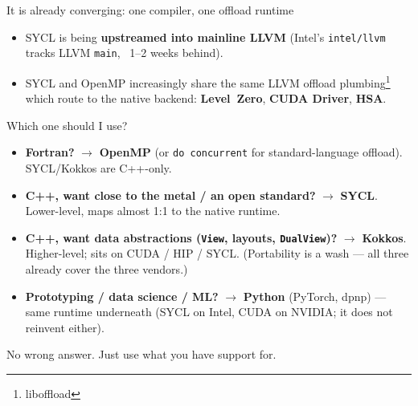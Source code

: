 \begin{frame}{It is already converging: one compiler, one offload runtime}
\begin{center}
\end{center}
\begin{itemize}
    \item SYCL is being \textbf{upstreamed into mainline LLVM} (Intel's \texttt{intel/llvm}
          tracks LLVM \texttt{main}, ~1--2 weeks behind).
    \item SYCL and OpenMP increasingly share the same LLVM offload plumbing\footnote{liboffload}  which route to the native backend: \textbf{Level~Zero}, \textbf{CUDA Driver}, \textbf{HSA}.
\end{itemize}

\end{frame}


\begin{frame}{Which one should I use?}
\begin{itemize}
    \item \textbf{Fortran?} $\rightarrow$ \textbf{OpenMP} (or \texttt{do concurrent}
          for standard-language offload). SYCL/Kokkos are C++-only.
    \item \textbf{C++, want close to the metal / an open standard?} $\rightarrow$
          \textbf{SYCL}. Lower-level, maps almost 1:1 to the native runtime.
    \item \textbf{C++, want data abstractions (\texttt{View}, layouts, \texttt{DualView})?}
          $\rightarrow$ \textbf{Kokkos}. Higher-level; sits on CUDA / HIP / SYCL.
          (Portability is a wash --- all three already cover the three vendors.)
    \item \textbf{Prototyping / data science / ML?} $\rightarrow$ \textbf{Python}
          (PyTorch, dpnp) --- same runtime underneath (SYCL on Intel, CUDA on
          NVIDIA; it does not reinvent either).
\end{itemize}
\alert{No wrong answer. Just use what you have support for.}
\end{frame}


